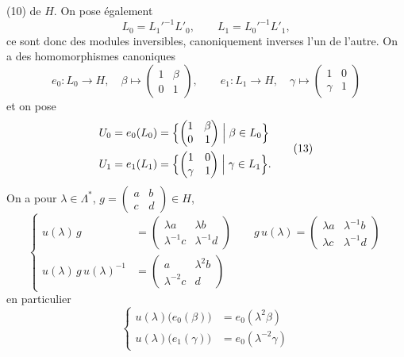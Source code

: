 \documentclass[11pt,a4paper]{article}
\begin{document}
(10) de $H$. On pose également
\[
L_0 = L_1'^{-1} L'_0, \qquad L_1 = L_0'^{-1} L'_1, \tag{11}
\]
ce sont donc des modules inversibles, canoniquement inverses l'un de l'autre. On a des homomorphismes canoniques
\[
e_0 : L_0 \longrightarrow H, \quad \beta \longmapsto \begin{pmatrix} 1 & \beta \\ 0 & 1 \end{pmatrix}, \qquad
e_1 : L_1 \longrightarrow H, \quad \gamma \longmapsto \begin{pmatrix} 1 & 0 \\ \gamma & 1 \end{pmatrix} \tag{12}
\]
et on pose
\[
\begin{aligned}
U_0 &= e_0(L_0) = \Bigl\{ \begin{pmatrix} 1 & \beta \\ 0 & 1 \end{pmatrix} \Bigm| \beta \in L_0 \Bigr\} \\
U_1 &= e_1(L_1) = \Bigl\{ \begin{pmatrix} 1 & 0 \\ \gamma & 1 \end{pmatrix} \Bigm| \gamma \in L_1 \Bigr\} .
\end{aligned} \tag{13}
\]
On a pour $\lambda \in \Lambda^*$, $g = \begin{pmatrix} a & b \\ c & d \end{pmatrix} \in H$,
\[
\left\{
\begin{aligned}
u(\lambda)\, g &= \begin{pmatrix} \lambda a & \lambda b \\ \lambda^{-1}c & \lambda^{-1}d \end{pmatrix} \qquad
g\, u(\lambda) = \begin{pmatrix} \lambda a & \lambda^{-1}b \\ \lambda c & \lambda^{-1}d \end{pmatrix} \\
u(\lambda)\, g\, u(\lambda)^{-1} &= \begin{pmatrix} a & \lambda^2 b \\ \lambda^{-2}c & d \end{pmatrix}
\end{aligned}
\right. \tag{14}
\]
en particulier
\[
\left\{
\begin{aligned}
u(\lambda)\bigl(e_0(\beta)\bigr) &= e_0(\lambda^2\beta) \\
u(\lambda)\bigl(e_1(\gamma)\bigr) &= e_0(\lambda^{-2}\gamma)
\end{aligned}
\right. \tag{15}
\]
\end{document}
